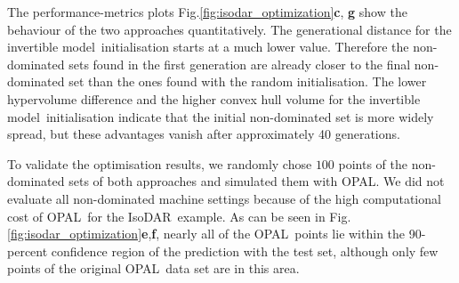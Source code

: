 \documentclass[a4paper, 12pt, version-1-compatibility]{article}
\def\invertiblemodel{invertible model}
\def\isodar{IsoDAR}
\def\opal{OPAL}
\newcommand{\figref}[1]{Fig.\xspace\ref{#1}}
\begin{document}
The performance-metrics plots \figref{fig:isodar_optimization}\textbf{c}, \textbf{g} show the behaviour of the two approaches quantitatively.
The generational distance for the \invertiblemodel\ initialisation starts at a much lower value. Therefore the non-dominated sets found in the first generation are already closer to the final non-dominated set than the ones found with the random initialisation. 
The lower hypervolume difference and the higher convex hull volume for the \invertiblemodel\ initialisation indicate that the initial non-dominated set is more widely spread, but these advantages vanish after approximately 40 generations. 




To validate the optimisation results, we randomly chose $100$ points of the non-dominated sets of both approaches and simulated them with \opal. We did not evaluate all non-dominated machine settings because of the high computational cost of \opal\ for the \isodar\ example.
As can be seen in \figref{fig:isodar_optimization}\textbf{e},\textbf{f}, nearly all of the \opal\ points lie within the 90-percent confidence region of the prediction with the test set, although only few points of the original \opal\ data set are in this area. 
\end{document}
